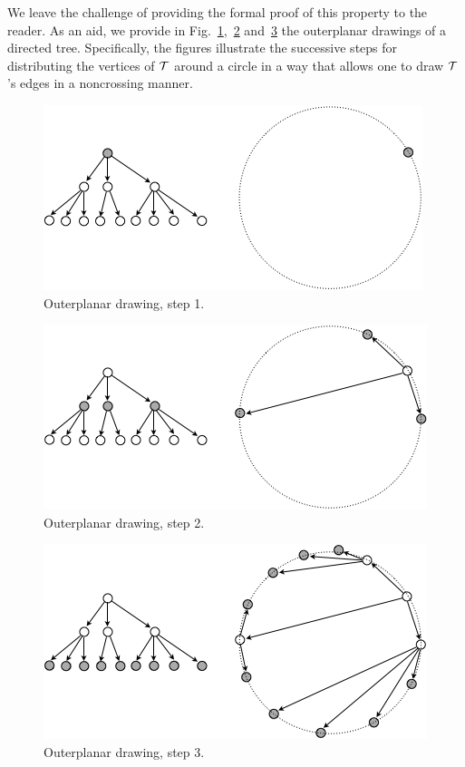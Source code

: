 We leave the challenge of providing the formal proof of this property to the reader.   As an aid, we provide in
Fig.~\ref{fig:treeoutplanar1},~\ref{fig:treeoutplanar2} and~\ref{fig:treeoutplanar3} the outerplanar drawings of a directed tree.
Specifically, the figures illustrate the successive steps for distributing the vertices of $\mbox{$\cal T$}$ around a circle 
in a way that allows one to draw $\mbox{$\cal T$}$'s edges in a noncrossing manner.
\begin{figure}[hbt]
\begin{center}
       \includegraphics[scale=0.5]{FiguresGraph/TreeOutplanar1}
       \caption{Outerplanar drawing, step 1.}
  \label{fig:treeoutplanar1}
\end{center}
\end{figure}
\begin{figure}[hbt]
\begin{center}
       \includegraphics[scale=0.5]{FiguresGraph/TreeOutplanar2}
       \caption{Outerplanar drawing, step 2.}
  \label{fig:treeoutplanar2}
\end{center}
\end{figure}
\begin{figure}[hbt]
\begin{center}
       \includegraphics[scale=0.5]{FiguresGraph/TreeOutplanar3}
       \caption{Outerplanar drawing, step 3.}
  \label{fig:treeoutplanar3}
\end{center}
\end{figure}

